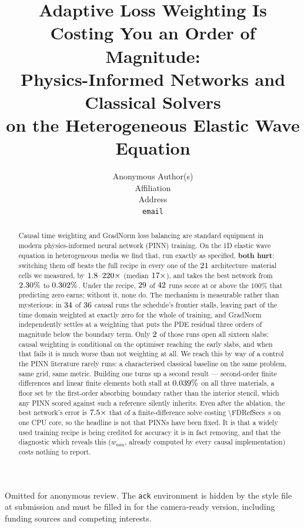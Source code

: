 \documentclass{article}
\title{Adaptive Loss Weighting Is Costing You an Order of Magnitude:\\
       Physics-Informed Networks and Classical Solvers\\
       on the Heterogeneous Elastic Wave Equation}
\author{%
  Anonymous Author(s) \\
  Affiliation \\
  Address \\
  \texttt{email} \\
}
\begin{document}
\maketitle

\begin{abstract}
Causal time weighting and GradNorm loss balancing are standard equipment in
modern physics-informed neural network (PINN) training. On the 1D elastic wave
equation in heterogeneous media we find that, run exactly as specified,
\textbf{both hurt}: switching them off beats the full recipe in every one of
the $21$ architecture--material cells we measured, by
$1.8$--$220\times$ (median $17\times$), and takes
the best network from $2.30\%$ to $0.302\%$. Under the
recipe, $29$ of $42$ runs score at or above
the $100\%$ that predicting zero earns; without it, none do. The mechanism is
measurable rather than mysterious: in $34$ of $36$
causal runs the schedule's frontier stalls, leaving part of the time domain
weighted at exactly zero for the whole of training, and GradNorm independently
settles at a weighting that puts the PDE residual three orders of magnitude
below the boundary term. Only $2$ of those runs open all
sixteen slabs: causal weighting is conditional on the optimiser reaching the
early slabs, and when that fails it is much worse than not weighting at all. We
reach this by way of a control the PINN literature rarely runs: a characterised
classical
baseline on the same problem, same grid, same metric. Building one turns up a
second result --- second-order finite differences and linear finite elements
both stall at $0.039\%$ on all three materials, a floor set by the
first-order absorbing boundary rather than the interior stencil, which any PINN
scored against such a reference silently inherits. Even after the ablation, the
best network's error is $7.5\times$ that of a finite-difference solve
costing \SI{\FDRefSecs}{\second} on one CPU core, so the headline is not that
PINNs have been fixed. It is that a widely used training recipe is being
credited for accuracy it is in fact removing, and that the diagnostic which
reveals this ($w_{\min}$, already computed by every causal implementation)
costs nothing to report.
\end{abstract}



\begin{ack}
Omitted for anonymous review. The \texttt{ack} environment is hidden by the
style file at submission and must be filled in for the camera-ready version,
including funding sources and competing interests.
\end{ack}





\appendix




\newpage

\end{document}
